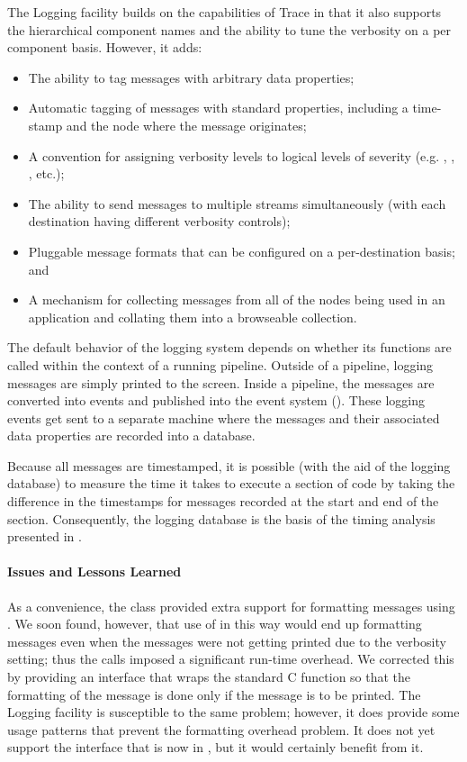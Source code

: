 The Logging facility builds on the capabilities of Trace
in that it also supports the hierarchical component names and the
ability to tune the verbosity on a per component basis.  However, it
adds:
\begin{itemize}
\item  The ability to tag messages with arbitrary data properties;
\item  Automatic tagging of messages with standard properties,
  including a time-stamp and the node where the message originates;
\item  A convention for assigning verbosity levels to logical levels
  of severity (e.g. , , , etc.);
\item  The ability to send messages to multiple streams
  simultaneously (with each destination having different verbosity
  controls);
\item  Pluggable message formats that can be configured on a 
  per-destination basis; and
\item  A mechanism for collecting messages from all of the nodes being
  used in an application and collating them into a browseable collection. 
\end{itemize}

The default behavior of the logging system depends on whether its
functions are called within the context of a running pipeline.
Outside of a pipeline, logging messages are simply printed to the
screen.  Inside a pipeline, the messages are converted into events and
published into the event system ().  These logging
events get sent to a separate machine where the messages and their
associated data properties are recorded into a database.  

Because all messages are timestamped, it is possible (with the aid of
the logging database) to measure the time it takes to execute a section
of code by taking the difference in the timestamps for messages
recorded at the start and end of the section.  Consequently, the
logging database is the basis of the timing analysis presented in
.  

\paragraph{Issues and Lessons Learned}

As a convenience, the  class provided extra support
for formatting messages using .  We soon found,
however, that use of  in this way would end up
formatting messages even when the messages were not getting printed
due to the verbosity setting; thus the  calls imposed a
significant run-time overhead.  We corrected this by providing an
interface that wraps the standard C function  so
that the formatting of the message is done only if the message is to
be printed.  The Logging facility is susceptible to the same
problem; however, it does provide some usage patterns that prevent the
formatting overhead problem.  It does not yet support the
 interface that is now in , but it would
certainly benefit from it.  

